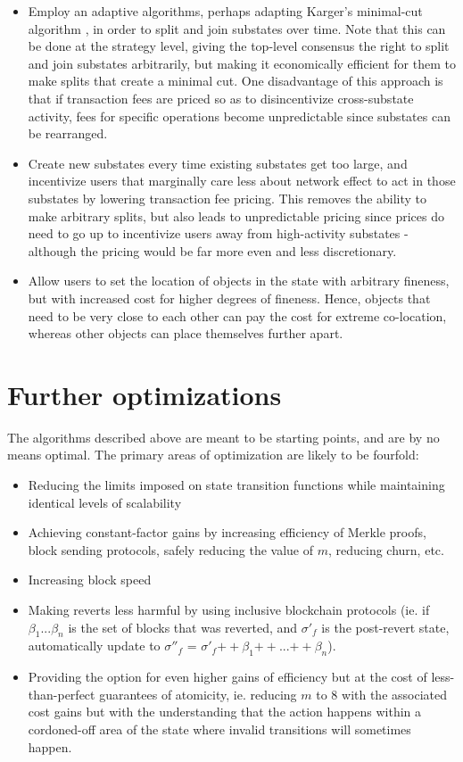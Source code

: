 \documentclass[11pt,a4paper]{report}
\theoremstyle{plain}
\theoremstyle{definition}
\theoremstyle{remark}
\begin{document}
\begin{itemize}
\item
Employ an adaptive algorithms, perhaps adapting Karger's minimal-cut algorithm \cite{karger}, in order to split and join substates over time. Note that this can be done at the strategy level, giving the top-level consensus the right to split and join substates arbitrarily, but making it economically efficient for them to make splits that create a minimal cut. One disadvantage of this approach is that if transaction fees are priced so as to disincentivize cross-substate activity, fees for specific operations become unpredictable since substates can be rearranged.
\item
Create new substates every time existing substates get too large, and incentivize users that marginally care less about network effect to act in those substates by lowering transaction fee pricing. This removes the ability to make arbitrary splits, but also leads to unpredictable pricing since prices do need to go up to incentivize users away from high-activity substates - although the pricing would be far more even and less discretionary.
\item
Allow users to set the location of objects in the state with arbitrary fineness, but with increased cost for higher degrees of fineness. Hence, objects that need to be very close to each other can pay the cost for extreme co-location, whereas other objects can place themselves further apart.
\end{itemize}

\chapter{Further optimizations}

The algorithms described above are meant to be starting points, and are by no means optimal. The primary areas of optimization are likely to be fourfold:

\begin{itemize}
\item
Reducing the limits imposed on state transition functions while maintaining identical levels of scalability
\item
Achieving constant-factor gains by increasing efficiency of Merkle proofs, block sending protocols, safely reducing the value of $m$, reducing churn, etc.
\item
Increasing block speed
\item
Making reverts less harmful by using inclusive blockchain protocols (ie. if $\beta_1 ... \beta_n$ is the set of blocks that was reverted, and $\sigma'_f$ is the post-revert state, automatically update to $\sigma''_f$ = $\sigma'_f {++} \beta_1 {++} ... {++} \beta_n$).
\item
Providing the option for even higher gains of efficiency but at the cost of less-than-perfect guarantees of atomicity, ie. reducing $m$ to $8$ with the associated cost gains but with the understanding that the action happens within a cordoned-off area of the state where invalid transitions will sometimes happen.
\end{itemize}
\end{document}
